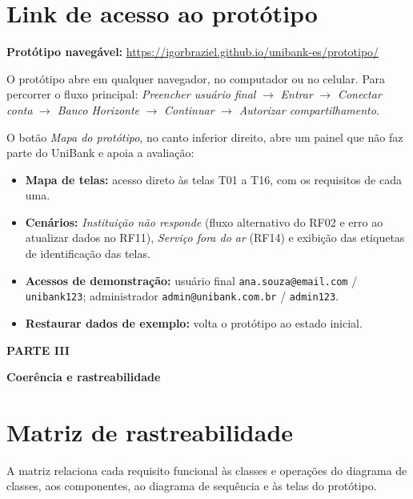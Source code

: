 \documentclass[11pt,a4paper]{article}
\newcommand{\cls}[1]{\texttt{#1}}
\newcommand{\parte}[2]{\clearpage
  {\small\bfseries\color{titleblue}PARTE #1\par}\vspace{2pt}
  {\LARGE\bfseries #2\par}\vspace{4pt}}
\newcommand{\protolink}{https://igorbraziel.github.io/unibank-es/prototipo/}
\begin{document}
\section{Link de acesso ao protótipo}
\label{sec:link}

\textbf{Protótipo navegável:} \url{\protolink}

O protótipo abre em qualquer navegador, no computador ou no celular. Para percorrer o fluxo principal: \emph{Preencher usuário final} $\rightarrow$ \emph{Entrar} $\rightarrow$ \emph{Conectar conta} $\rightarrow$ \emph{Banco Horizonte} $\rightarrow$ \emph{Continuar} $\rightarrow$ \emph{Autorizar compartilhamento}.

O botão \emph{Mapa do protótipo}, no canto inferior direito, abre um painel que não faz parte do UniBank e apoia a avaliação:

\begin{itemize}
\item \textbf{Mapa de telas:} acesso direto às telas T01 a T16, com os requisitos de cada uma.
\item \textbf{Cenários:} \emph{Instituição não responde} (fluxo alternativo do RF02 e erro ao atualizar dados no RF11), \emph{Serviço fora do ar} (RF14) e exibição das etiquetas de identificação das telas.
\item \textbf{Acessos de demonstração:} usuário final \cls{ana.souza@email.com} / \cls{unibank123}; administrador \cls{admin@unibank.com.br} / \cls{admin123}.
\item \textbf{Restaurar dados de exemplo:} volta o protótipo ao estado inicial.
\end{itemize}

\parte{III}{Coerência e rastreabilidade}

\section{Matriz de rastreabilidade}
\label{sec:matriz}

A matriz relaciona cada requisito funcional às classes e operações do diagrama de classes, aos componentes, ao diagrama de sequência e às telas do protótipo.
\end{document}
